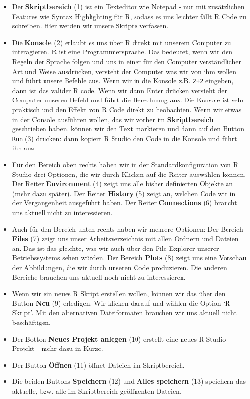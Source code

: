 \documentclass[]{book}
\begin{document}
\begin{itemize}
\item
  Der \textbf{Skriptbereich} (1) ist ein Texteditor wie Notepad - nur
  mit zusätzlichen Features wie Syntax Highlighting für R, sodass es uns
  leichter fällt R Code zu schreiben. Hier werden wir unsere Skripte
  verfassen.
\item
  Die \textbf{Konsole} (2) erlaubt es uns über R direkt mit unserem
  Computer zu interagieren. R ist eine Programmiersprache. Das bedeutet,
  wenn wir den Regeln der Sprache folgen und uns in einer für den
  Computer verständlicher Art und Weise ausdrücken, versteht der
  Computer was wir von ihm wollen und führt unsere Befehle aus. Wenn wir
  in die Konsole z.B. \texttt{2+2} eingeben, dann ist das valider R
  code. Wenn wir dann Enter drücken versteht der Computer unseren Befehl
  und führt die Berechnung aus. Die Konsole ist sehr praktisch und den
  Effekt von R Code direkt zu beobachten. Wenn wir etwas in der Console
  ausführen wollen, das wir vorher im \textbf{Skriptbereich} geschrieben
  haben, können wir den Text markieren und dann auf den Button
  \texttt{Run} (3) drücken: dann kopiert R Studio den Code in die
  Konsole und führt ihn aus.
\item
  Für den Bereich oben rechts haben wir in der Standardkonfiguration von
  R Studio drei Optionen, die wir durch Klicken auf die Reiter auswählen
  können. Der Reiter \textbf{Environment} (4) zeigt uns alle bisher
  definierten Objekte an (mehr dazu später). Der Reiter \textbf{History}
  (5) zeigt an, welchen Code wir in der Vergangenheit ausgeführt haben.
  Der Reiter \textbf{Connections} (6) braucht uns aktuell nicht zu
  interessieren.
\item
  Auch für den Bereich unten rechts haben wir mehrere Optionen: Der
  Bereich \textbf{Files} (7) zeigt uns unser Arbeitsverzeichnis mit
  allen Ordnern und Dateien an. Das ist das gleichte, was wir auch über
  den File Explorer unserer Betriebssystems sehen würden. Der Bereich
  \textbf{Plots} (8) zeigt uns eine Vorschau der Abbildungen, die wir
  durch unseren Code produzieren. Die anderen Bereiche brauchen uns
  aktuell noch nicht zu interessieren.
\item
  Wenn wir ein neues R Skript erstellen wollen, können wir das über den
  Button \textbf{Neu} (9) erledigen. Wir klicken darauf und wählen die
  Option `R Skript'. Mit den alternativen Dateiformaten brauchen wir uns
  aktuell nicht beschäftigen.
\item
  Der Botton \textbf{Neues Projekt anlegen} (10) erstellt eine neues R
  Studio Projekt - mehr dazu in Kürze.
\item
  Der Button \textbf{Öffnen} (11) öffnet Dateien im Skriptbereich.
\item
  Die beiden Buttons \textbf{Speichern} (12) und \textbf{Alles
  speichern} (13) speichern das aktuelle, bzw. alle im Skriptbereich
  geöffnenten Dateien.
\end{itemize}
\end{document}
